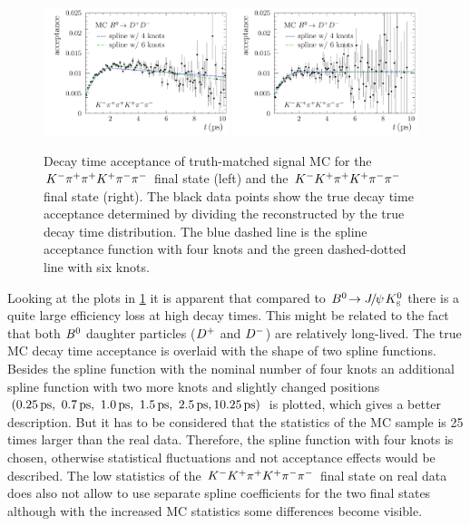 \begin{figure}[htb]
\centering
\includegraphics[width=0.48\textwidth]{07-B02DD/tikz/pdf/Acceptancespline_nolog_MC_Kpipi.pdf}
\includegraphics[width=0.48\textwidth]{07-B02DD/tikz/pdf/Acceptancespline_nolog_MC_KKpi.pdf}
\caption{Decay time acceptance of truth-matched signal MC for the ${{K}^-}{{\pi}^+}{{\pi}^+}{{K}^+}{{\pi}^-}{{\pi}^-}$
final state (left) and the ${{K}^-}{{K}^+}{{\pi}^+}{{K}^+}{{\pi}^-}{{\pi}^-}$ final state (right). The black data
points show the true decay time acceptance determined by dividing the
reconstructed by the true decay time distribution. The blue dashed line is the
spline acceptance function with four knots and the green dashed-dotted line
with six knots.}
\label{fig:b02dd:decaytimefit:acceptance_MC}
\end{figure}

Looking at the plots in \cref{fig:b02dd:decaytimefit:acceptance_MC} it is
apparent that compared to ${{B}^0}\!\rightarrow {\ensuremath{{J\mskip -3mu/\mskip -2mu\psi\mskip 2mu}}}{\ensuremath{{K}^0_{\mathrm{ \scriptscriptstyle S}}}}$ there is a quite large efficiency loss
at high decay times. This might be related to the fact that both ${{B}^0}$
daughter particles (${{D}^+}$ and ${{D}^-}$) are relatively long-lived. The true MC
decay time acceptance is overlaid with the shape of two spline functions.
Besides the spline function with the nominal number of four knots an
additional spline function with two more knots and slightly changed positions
$(\SIlist[list-final-separator={, }]{0.25;0.7;1.0;1.5;2.5;10.25}{\ps})$ is
plotted, which gives a better description. But it has to be considered that
the statistics of the MC sample is \num{25} times larger than the real data.
Therefore, the spline function with four knots is chosen, otherwise
statistical fluctuations and not acceptance effects would be described. The
low statistics of the ${{K}^-}{{K}^+}{{\pi}^+}{{K}^+}{{\pi}^-}{{\pi}^-}$ final state on real data does also not
allow to use separate spline coefficients for the two final states although
with the increased MC statistics some differences become visible.
